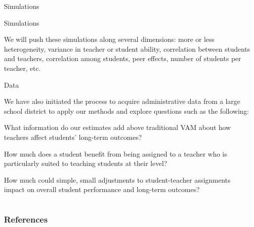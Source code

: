 \documentclass[11pt]{beamer}
\newenvironment{wideitemize}{\itemize\addtolength{\itemsep}{14pt}}{\enditemize}
\begin{document}
\begin{frame}{Simulations}
{}


\end{frame}



\begin{frame}{Simulations}

    We will push these simulations along several dimensions: more or less heterogeneity, variance in teacher or student ability, correlation between students and teachers, correlation among students, peer effects, number of students per teacher, etc.

\end{frame}



\begin{frame}{Data}

    We have also initiated the process to acquire administrative data from a large school district to apply our methods and explore questions such as the following:
    
    \begin{wideitemize}
        \item What information do our estimates add above traditional VAM about how teachers affect students' long-term outcomes?
        \item How much does a student benefit from being assigned to a teacher who is particularly suited to teaching students at their level?
        \item How much could simple, small adjustments to student-teacher assignments impact on overall student performance and long-term outcomes?
    \end{wideitemize}

\end{frame}





\section*{}
\begin{frame}[noframenumbering, shrink=10]
    \frametitle{References}
    
\end{frame}
\end{document}
